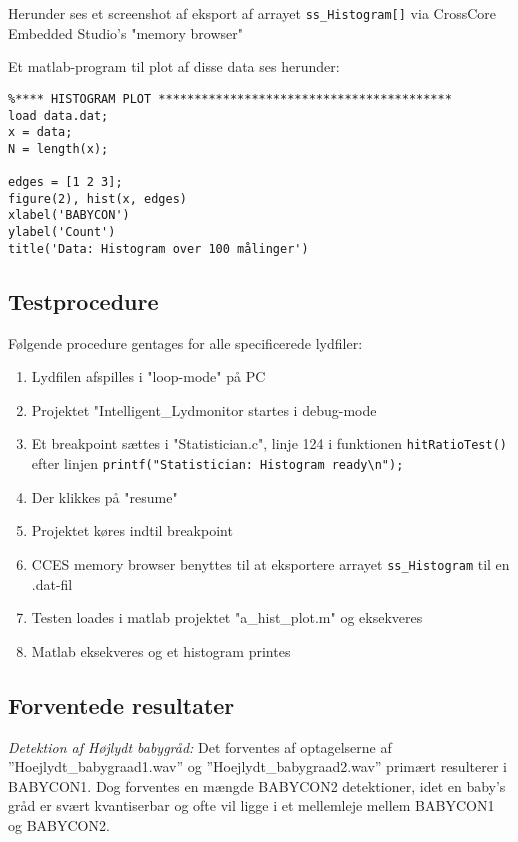 Herunder ses et screenshot af eksport af arrayet \verb+ss_Histogram[]+ via CrossCore Embedded Studio's "memory browser" 

Et matlab-program til plot af disse data ses herunder:
\begin{verbatim}%**** HISTOGRAM PLOT *****************************************
load data.dat;
x = data;
N = length(x);

edges = [1 2 3];
figure(2), hist(x, edges)
xlabel('BABYCON')
ylabel('Count')
title('Data: Histogram over 100 målinger')
\end{verbatim}

\subsection{Testprocedure}
Følgende procedure gentages for alle specificerede lydfiler:
\begin{enumerate}
	\item Lydfilen afspilles i "loop-mode" på PC
	\item Projektet "Intelligent\_Lydmonitor startes i debug-mode
	\item Et breakpoint sættes i "Statistician.c", linje 124 i funktionen \verb+hitRatioTest()+ efter linjen \verb+printf("Statistician: Histogram ready\n");+ 
	\item Der klikkes på "resume"
	\item Projektet køres indtil breakpoint
	\item CCES memory browser benyttes til at eksportere arrayet \verb+ss_Histogram+ til en .dat-fil
	\item Testen loades i matlab projektet "a\_hist\_plot.m" og eksekveres
	\item Matlab eksekveres og et histogram printes 
\end{enumerate}

\subsection{Forventede resultater} 
\textit{Detektion af Højlydt babygråd:} Det forventes af optagelserne af ''Hoejlydt\_babygraad1.wav'' og ''Hoejlydt\_babygraad2.wav'' primært resulterer i BABYCON1. Dog forventes en mængde BABYCON2 detektioner, idet en baby's gråd er svært kvantiserbar og ofte vil ligge i et mellemleje mellem BABYCON1 og BABYCON2. \\

